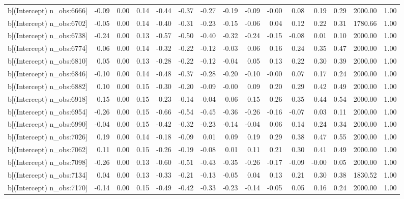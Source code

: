 \begin{table}[ht]
\begin{tabular}{rrrrrrrrrrrrrrr}
  b[(Intercept) n\_obs:6666] & -0.09 & 0.00 & 0.14 & -0.44 & -0.37 & -0.27 & -0.19 & -0.09 & -0.00 & 0.08 & 0.19 & 0.29 & 2000.00 & 1.00 \\ 
  b[(Intercept) n\_obs:6702] & -0.05 & 0.00 & 0.14 & -0.40 & -0.31 & -0.23 & -0.15 & -0.06 & 0.04 & 0.12 & 0.22 & 0.31 & 1780.66 & 1.00 \\ 
  b[(Intercept) n\_obs:6738] & -0.24 & 0.00 & 0.13 & -0.57 & -0.50 & -0.40 & -0.32 & -0.24 & -0.15 & -0.08 & 0.01 & 0.10 & 2000.00 & 1.00 \\ 
  b[(Intercept) n\_obs:6774] & 0.06 & 0.00 & 0.14 & -0.32 & -0.22 & -0.12 & -0.03 & 0.06 & 0.16 & 0.24 & 0.35 & 0.47 & 2000.00 & 1.00 \\ 
  b[(Intercept) n\_obs:6810] & 0.05 & 0.00 & 0.13 & -0.28 & -0.22 & -0.12 & -0.04 & 0.05 & 0.13 & 0.22 & 0.30 & 0.39 & 2000.00 & 1.00 \\ 
  b[(Intercept) n\_obs:6846] & -0.10 & 0.00 & 0.14 & -0.48 & -0.37 & -0.28 & -0.20 & -0.10 & -0.00 & 0.07 & 0.17 & 0.24 & 2000.00 & 1.00 \\ 
  b[(Intercept) n\_obs:6882] & 0.10 & 0.00 & 0.15 & -0.30 & -0.20 & -0.09 & -0.00 & 0.09 & 0.20 & 0.29 & 0.42 & 0.49 & 2000.00 & 1.00 \\ 
  b[(Intercept) n\_obs:6918] & 0.15 & 0.00 & 0.15 & -0.23 & -0.14 & -0.04 & 0.06 & 0.15 & 0.26 & 0.35 & 0.44 & 0.54 & 2000.00 & 1.00 \\ 
  b[(Intercept) n\_obs:6954] & -0.26 & 0.00 & 0.15 & -0.66 & -0.54 & -0.45 & -0.36 & -0.26 & -0.16 & -0.07 & 0.03 & 0.11 & 2000.00 & 1.00 \\ 
  b[(Intercept) n\_obs:6990] & -0.04 & 0.00 & 0.15 & -0.42 & -0.32 & -0.23 & -0.14 & -0.04 & 0.06 & 0.14 & 0.24 & 0.34 & 2000.00 & 1.00 \\ 
  b[(Intercept) n\_obs:7026] & 0.19 & 0.00 & 0.14 & -0.18 & -0.09 & 0.01 & 0.09 & 0.19 & 0.29 & 0.38 & 0.47 & 0.55 & 2000.00 & 1.00 \\ 
  b[(Intercept) n\_obs:7062] & 0.11 & 0.00 & 0.15 & -0.26 & -0.19 & -0.08 & 0.01 & 0.11 & 0.21 & 0.30 & 0.41 & 0.49 & 2000.00 & 1.00 \\ 
  b[(Intercept) n\_obs:7098] & -0.26 & 0.00 & 0.13 & -0.60 & -0.51 & -0.43 & -0.35 & -0.26 & -0.17 & -0.09 & -0.00 & 0.05 & 2000.00 & 1.00 \\ 
  b[(Intercept) n\_obs:7134] & 0.04 & 0.00 & 0.13 & -0.33 & -0.21 & -0.13 & -0.05 & 0.04 & 0.13 & 0.21 & 0.30 & 0.38 & 1830.52 & 1.00 \\ 
  b[(Intercept) n\_obs:7170] & -0.14 & 0.00 & 0.15 & -0.49 & -0.42 & -0.33 & -0.23 & -0.14 & -0.05 & 0.05 & 0.16 & 0.24 & 2000.00 & 1.00 \\ 

\end{tabular}
\end{table}
